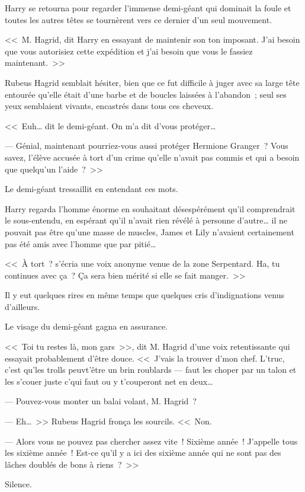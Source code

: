 Harry se retourna pour regarder l'immense demi-géant qui dominait la foule et toutes les autres têtes se tournèrent vers ce dernier d'un seul mouvement.

<<~M. Hagrid, dit Harry en essayant de maintenir son ton imposant. J'ai besoin que vous autorisiez cette expédition et j'ai besoin que vous le fassiez maintenant.~>>

Rubeus Hagrid semblait hésiter, bien que ce fut difficile à juger avec sa large tête entourée qu'elle était d'une barbe et de boucles laissées à l'abandon~; seul ses yeux semblaient vivants, encastrés dans tous ces cheveux.

<<~Euh… dit le demi-géant. On m'a dit d'vous protéger…

--- Génial, maintenant pourriez-vous aussi protéger Hermione Granger~? Vous savez, l'élève accusée à tort d'un crime qu'elle n'avait pas commis et qui a besoin que quelqu'un l'aide~?~>>

Le demi-géant tressaillit en entendant ces mots.

Harry regarda l'homme énorme en souhaitant désespérément qu'il comprendrait le sous-entendu, en espérant qu'il n'avait rien révélé à personne d'autre… il ne pouvait pas être qu'une masse de muscles, James et Lily n'avaient certainement pas été amis avec l'homme que par pitié…

<<~À tort~? s'écria une voix anonyme venue de la zone Serpentard. Ha, tu continues avec ça~? Ça sera bien mérité si elle se fait manger.~>>

Il y eut quelques rires en même temps que quelques cris d'indignations venus d'ailleurs.

Le visage du demi-géant gagna en assurance.

<<~Toi tu restes là, mon gars~>>, dit M. Hagrid d'une voix retentissante qui essayait probablement d'être douce. <<~J'vais la trouver d'mon chef. L'truc, c'est qu'les trolls peuvt'être un brin roublards — faut les choper par un talon et les s'couer juste c'qui faut ou y t'couperont net en deux…

--- Pouvez-vous monter un balai volant, M. Hagrid~?

--- Eh…~>> Rubeus Hagrid fronça les sourcils. <<~Non.

--- Alors vous ne pouvez pas chercher assez vite~! Sixième année~! J'appelle tous les sixième année~! Est-ce qu'il y a ici des sixième année qui ne sont pas des lâches doublés de bons à riens~?~>>

Silence.

